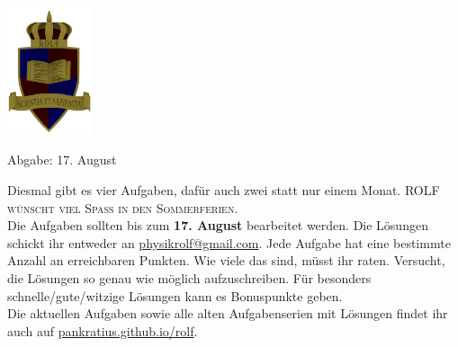 \documentclass[a4paper]{article}
\begin{document}
	\vspace*{-2cm}
	\parbox{4cm}{\includegraphics[width=2.5cm]{../images/ROLF4.png}}
	\parbox{10.6cm}{ %
				 Abgabe: 17. August \\ \vspace*{-.5cm} }
	
	

\pagestyle{empty}
\begin{framed}
	\noindent
	\scriptsize
	Diesmal gibt es vier Aufgaben, dafür auch zwei statt nur einem Monat. \textsc{ROLF wünscht viel Spaß in den Sommerferien.}\\
	Die Aufgaben sollten bis zum \textbf{17. August} bearbeitet werden. Die Lösungen schickt ihr entweder an \href{mailto:physikrolf@gmail.com}{physikrolf@gmail.com}.
	Jede Aufgabe hat eine bestimmte Anzahl an erreichbaren Punkten. Wie viele das sind, müsst ihr raten. Versucht, die Lösungen so genau wie möglich aufzuschreiben. Für besonders schnelle/gute/witzige Lösungen kann es Bonuspunkte geben.\\ Die aktuellen Aufgaben sowie alle alten Aufgabenserien mit Lösungen findet ihr auch auf \url{pankratius.github.io/rolf}.\\ %
\end{framed}

\noindent
\end{document}

